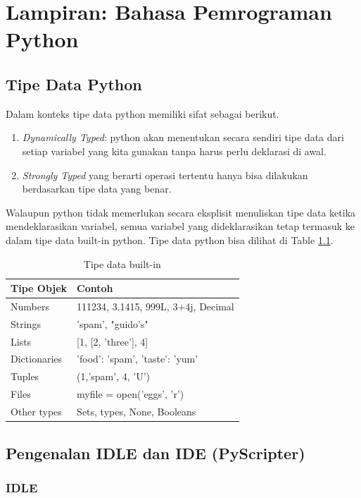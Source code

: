 \chapter{Lampiran: Bahasa Pemrograman Python}\label{ch:app1}
\section{Tipe Data Python}

Dalam konteks tipe data python memiliki sifat sebagai berikut.
\begin{enumerate}
	\item \textit{Dynamically Typed}: python akan menentukan secara sendiri tipe data dari setiap variabel yang kita gunakan tanpa harus perlu deklarasi di awal.
	\item \textit{Strongly Typed} yang berarti operasi tertentu hanya bisa dilakukan berdasarkan tipe data yang benar. 
\end{enumerate}

Walaupun python tidak memerlukan secara eksplisit menuliskan tipe data ketika mendeklarasikan variabel, semua variabel yang dideklarasikan tetap termasuk ke dalam tipe data built-in python. Tipe data python bisa dilihat di Table \ref{tbl:tipeDataPython}.

\begin{table}[H]%
\caption{Tipe data built-in}
\centering
\begin{tabular}{|l|l|}
\hline
Tipe Objek & Contoh \\
\hline
Numbers & 111234, 3.1415, 999L, 3+4j, Decimal\\
Strings & 'spam', "guido's"\\
Lists & [1, [2, 'three'], 4]\\
Dictionaries & {'food': 'spam', 'taste': 'yum'}\\
Tuples & (1,'spam', 4, 'U')\\
Files & myfile = open('eggs', 'r')\\
Other types & Sets, types, None, Booleans\\
\hline
\end{tabular}
\label{tbl:tipeDataPython}
\end{table} 

\section{Pengenalan IDLE dan IDE (PyScripter)}

\subsection{IDLE}

